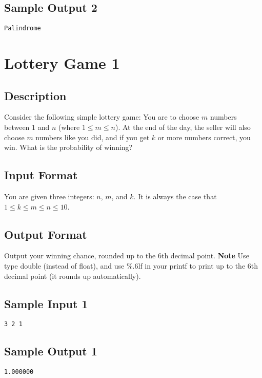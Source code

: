 \subsection*{Sample Output 2}
\begin{verbatim}
Palindrome
\end{verbatim}


\newpage

\section{Lottery Game 1}

\subsection*{Description}
Consider the following simple lottery game: You are to choose $m$ numbers between $1$ and $n$ (where $1 \leq m \leq n$). At the end of the day, the seller will also choose $m$ numbers like you did, and if you get $k$ or more numbers correct, you win. What is the probability of winning?

\subsection*{Input Format}
You are given three integers: $n$, $m$, and $k$. 
It is always the case that $1 \leq k \leq m\leq n \leq 10$. 

\subsection*{Output Format}
Output your winning chance, rounded up to the $6$th decimal point.
\textbf{Note} Use type double (instead of float), and use \%.6lf in your printf to print up to the 6th decimal point (it rounds up automatically).


\subsection*{Sample Input 1}
\begin{verbatim}
3 2 1
\end{verbatim}

\subsection*{Sample Output 1}
\begin{verbatim}
1.000000
\end{verbatim}

